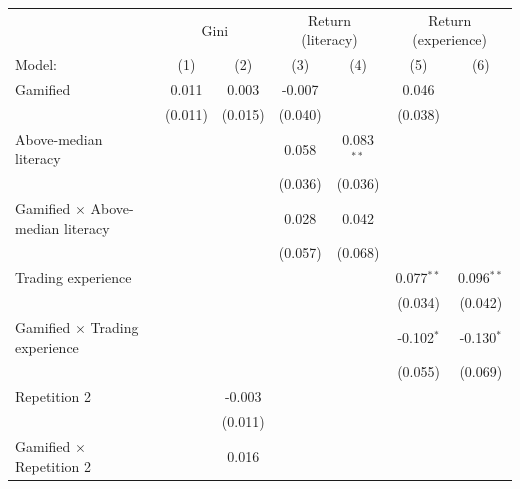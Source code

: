 \begin{tabular}{lcccccc}
   \tabularnewline \midrule \midrule
    & \multicolumn{2}{c}{Gini} & \multicolumn{2}{c}{Return (literacy)} & \multicolumn{2}{c}{Return (experience)} \\ 
   Model:                                   & (1)           & (2)           & (3)     & (4)          & (5)          & (6)\\  
   \midrule
   Gamified                                 & 0.011         & 0.003         & -0.007  &              & 0.046        &   \\   
                                            & (0.011)       & (0.015)       & (0.040) &              & (0.038)      &   \\   
   Above-median literacy                    &               &               & 0.058   & 0.083$^{**}$ &              &   \\   
                                            &               &               & (0.036) & (0.036)      &              &   \\   
   Gamified $\times$ Above-median literacy  &               &               & 0.028   & 0.042        &              &   \\   
                                            &               &               & (0.057) & (0.068)      &              &   \\   
   Trading experience                       &               &               &         &              & 0.077$^{**}$ & 0.096$^{**}$\\   
                                            &               &               &         &              & (0.034)      & (0.042)\\   
   Gamified $\times$ Trading experience     &               &               &         &              & -0.102$^{*}$ & -0.130$^{*}$\\   
                                            &               &               &         &              & (0.055)      & (0.069)\\   
   Repetition 2                             &               & -0.003        &         &              &              &   \\   
                                            &               & (0.011)       &         &              &              &   \\   
   Gamified $\times$ Repetition 2           &               & 0.016         &         &              &              &   \\   

\end{tabular}
